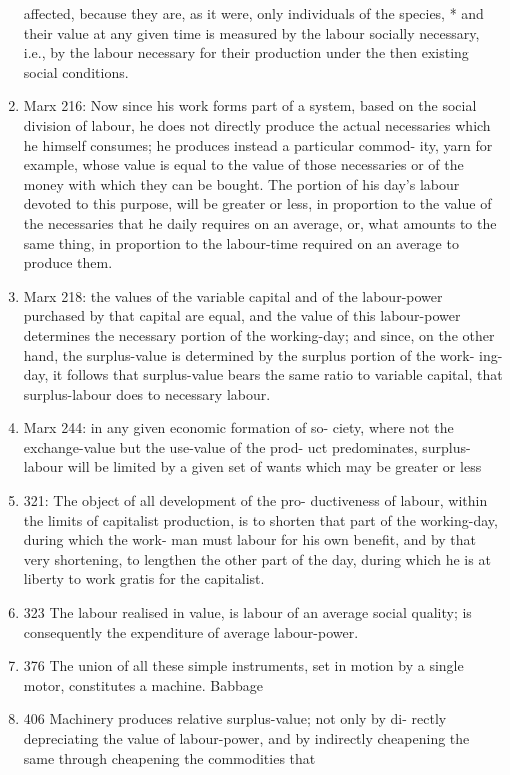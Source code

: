 \documentclass[12pt]{article}
\begin{document}
\begin{enumerate}
affected, because they are, as it were, only individuals of the
species, * and their value at any given time is measured by the
labour socially necessary, i.e., by the labour necessary for their
production under the then existing social conditions.
    \item Marx 216: Now since his
work forms part of a system, based on the social division of
labour, he does not directly produce the actual necessaries which
he himself consumes; he produces instead a particular commod-
ity, yarn for example, whose value is equal to the value of those
necessaries or of the money with which they can be bought. The
portion of his day's labour devoted to this purpose, will be
greater or less, in proportion to the value of the necessaries that he
daily requires on an average, or, what amounts to the same thing,
in proportion to the labour-time required on an average to produce
them.
    \item Marx 218: the values of the variable capital
and of the labour-power purchased by that capital are equal,
and the value of this labour-power determines the necessary
portion of the working-day; and since, on the other hand, the
surplus-value is determined by the surplus portion of the work-
ing-day, it follows that surplus-value bears the same ratio to
variable capital, that surplus-labour does to necessary labour.
    \item Marx 244: in any given economic formation of so-
ciety, where not the exchange-value but the use-value of the prod-
uct predominates, surplus-labour will be limited by a given set
of wants which may be greater or less
    \item 321:  The object of all development of the pro-
ductiveness of labour, within the limits of capitalist production,
is to shorten that part of the working-day, during which the work-
man must labour for his own benefit, and by that very shortening,
to lengthen the other part of the day, during which he is at liberty
to work gratis for the capitalist. 
	\item 323 The labour realised in value, is labour of an average social quality;
		is consequently the expenditure of average labour-power.
	\item 376 The union of all these simple instruments, set in motion by a single
motor, constitutes a machine. Babbage
	\item 406 Machinery produces relative surplus-value; not only by di-
rectly depreciating the value of labour-power, and by indirectly
cheapening the same through cheapening the commodities that

\end{enumerate}
\end{document}
